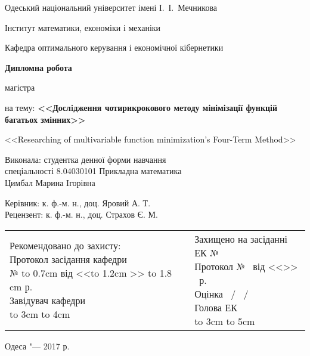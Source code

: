 \thispagestyle{empty}

\begin{center}
Одеський національний університет імені І.~І.~Мечникова

Інститут математики, економіки і механіки

Кафедра оптимального керування і економічної кібернетики
\end{center}

\vspace{2.5cm}

\begin{center}
\large
\textbf{Дипломна робота}

магістра

\bigskip

на тему: \textbf{<<Дослiдження чотирикрокового методу мінімізації функцій багатьох змінних>>}

\bigskip

\small{<<Researching of multivariable function minimization's Four-Term Method>>}
\end{center}

\vfill

\hfill
\begin{minipage}{0.65\textwidth}
Виконала: студентка денної форми навчання\\
спеціальності 8.04030101 Прикладна математика\\
Цимбал Марина Iгорівна

\medskip

Керівник: к. ф.-м. н., доц. Яровий А. Т.\\
Рецензент: к. ф.-м. н., доц. Страхов Є. М.
\end{minipage}

\vfill

\begin{flushleft}
\begin{tabular}{p{5cm}p{2.5cm}p{8cm}}
\makecell[l]{Рекомендовано до захисту:\\
Протокол засідання кафедри\\
№ \hbox to 0.7cm {\hrulefill} від <<\hbox to 1.2cm {\hrulefill}>> \hbox to 1.8 cm {\hrulefill} р.\\
Завідувач кафедри\\
\hbox to 3cm {\hrulefill} \hbox to 4cm{\hrulefill}
} & & \makecell[l]{Захищено на засіданні ЕК № \hrulefill \\
Протокол № \hrulefill\ від <<\hrulefill>> \hrulefill\ р.\\
Оцінка \hrulefill\ / \hrulefill\ / \hrulefill\ \\
Голова ЕК\\
\hbox to 3cm {\hrulefill} \hbox to 5cm{\hrulefill}}
\end{tabular}
\end{flushleft}


\vfill

\begin{center}
Одеса "--- 2017 р.
\end{center}

